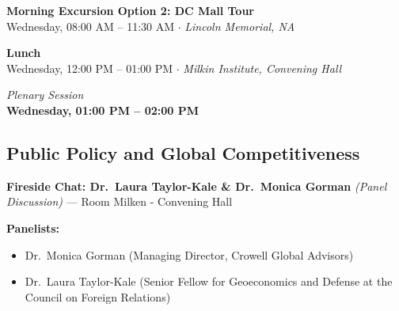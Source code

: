 \documentclass[
  10pt,
  letterpaper,
  DIV=11,
  numbers=noendperiod]{scrartcl}
\providecommand{\tightlist}{%
  \setlength{\itemsep}{0pt}\setlength{\parskip}{0pt}}\usepackage{longtable,booktabs,array}
\begin{document}
\vspace{1em}


\begin{center}
\colorbox{event!15}{\parbox{0.9\linewidth}{\centering
  \textcolor{event}{\large\textbf{Morning Excursion Option 2: DC Mall Tour}}\\[2pt]
  {\small Wednesday, 08:00 AM – 11:30 AM $\cdot$ \textit{Lincoln Memorial, NA}}
}}
\end{center}

\vspace{1em}


\begin{center}
\colorbox{event!15}{\parbox{0.9\linewidth}{\centering
  \textcolor{event}{\large\textbf{Lunch}}\\[2pt]
  {\small Wednesday, 12:00 PM – 01:00 PM $\cdot$ \textit{Milkin Institute, Convening Hall}}
}}
\end{center}

\vspace{1em}


\begin{center}
\normalsize\textit{Plenary Session}\\[0.3em]
\Large\textbf{Wednesday, 01:00 PM – 02:00 PM}
\end{center}

\subsection{\texorpdfstring{\textcolor{policy}{Public Policy and Global Competitiveness}}{}}\label{section}

\textbf{Fireside Chat: Dr.~Laura Taylor-Kale \& Dr.~Monica Gorman}
\emph{(Panel Discussion)} --- Room Milken - Convening Hall

\textbf{Panelists:}

\begin{itemize}
\tightlist
\item
  Dr.~Monica Gorman (Managing Director, Crowell Global Advisors)
\item
  Dr.~Laura Taylor-Kale (Senior Fellow for Geoeconomics and Defense at
  the Council on Foreign Relations)
\end{itemize}
\end{document}
